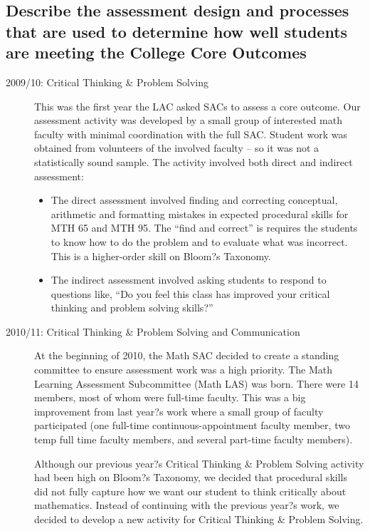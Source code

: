 \subsection{Describe the assessment design and processes that are used to determine how well students are meeting the College Core Outcomes}

\begin{description}
\item [2009/10: Critical Thinking  \& Problem Solving]

This was the first year the LAC asked SACs to assess a core outcome. Our assessment activity was developed by a small group of interested math faculty with minimal coordination with the full SAC. Student work was obtained from volunteers of the involved faculty -- so it was not a statistically sound sample.  The activity involved both direct and indirect assessment: 
\begin{itemize}
\item The direct assessment involved finding and correcting conceptual, arithmetic and formatting mistakes in expected procedural skills for MTH 65 and MTH 95.  The ``find and correct'' is requires the students to know how to do the problem and to evaluate what was incorrect.  This is a higher-order skill on Bloom?s Taxonomy. 

\item The indirect assessment involved asking students to respond to questions like, ``Do you feel this class has improved your critical thinking and problem solving skills?''
\end{itemize}

\item[2010/11:  Critical Thinking \& Problem Solving and Communication]

At the beginning of 2010, the Math SAC decided to create a standing committee to ensure assessment work was a high priority. The Math Learning Assessment Subcommittee (Math LAS) was born.  There were 14 members, most of whom were full-time faculty. This was a big improvement from last year?s work where a small group of faculty participated (one full-time continuous-appointment faculty member, two temp full time faculty members, and several part-time faculty members).

Although our previous year?s Critical Thinking \& Problem Solving activity had been high on Bloom?s Taxonomy, we decided that procedural skills did not fully capture how we want our student to think critically about mathematics.  Instead of continuing with the previous year?s work, we decided to develop a new activity for Critical Thinking \& Problem Solving. 


\end{description}
